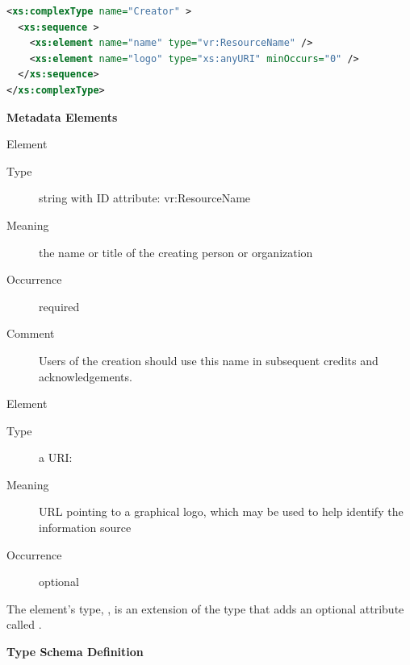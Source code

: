 \documentclass[11pt,a4paper]{ivoa}
\begin{document}
\begin{lstlisting}[language=XML,basicstyle=\footnotesize]
<xs:complexType name="Creator" >
  <xs:sequence >
    <xs:element name="name" type="vr:ResourceName" />
    <xs:element name="logo" type="xs:anyURI" minOccurs="0" />
  </xs:sequence>
</xs:complexType>
\end{lstlisting}

\vspace{0.5ex}\noindent\textbf{ Metadata Elements}

\begingroup\small\begin{bigdescription}\item[Element \xmlel{name}]
\begin{description}
\item[Type] string with ID attribute: vr:ResourceName
\item[Meaning] 
                  the name or title of the creating person or organization
              
\item[Occurrence] required
\item[Comment] 
                  Users of the creation should use this name in
                  subsequent credits and acknowledgements.
              

\end{description}
\item[Element \xmlel{logo}]
\begin{description}
\item[Type] a URI: 
\item[Meaning] 
                URL pointing to a graphical logo, which may be used to help 
                identify the information source
              
\item[Occurrence] optional

\end{description}


\end{bigdescription}\endgroup

\endgroup


The  element's type, , is an extension of the
 type that adds an
optional attribute called .  


\begingroup
      	\renewcommand*\descriptionlabel[1]{%
      	\hbox to 5.5em{\emph{#1}\hfil}}\vspace{1ex}\noindent\textbf{ Type Schema Definition}
\end{document}
